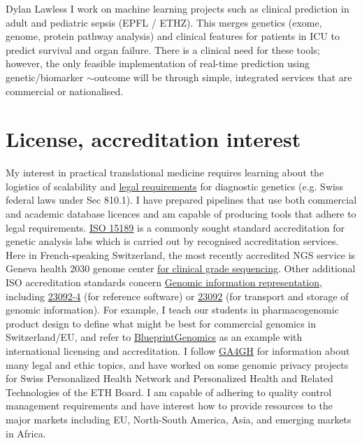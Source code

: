 \documentclass[11pt,a4paper]{article}
\begin{document}
\begin{cv}{Dylan Lawless}
I work on machine learning projects such as clinical prediction in adult and pediatric sepsis (EPFL / ETHZ). 
This merges genetics (exome, genome, protein pathway analysis) and clinical features for patients in ICU to predict  survival and organ failure. 
There is a clinical need for these tools; however, the only feasible implementation of real-time prediction using genetic/biomarker $\sim$outcome will be through simple, integrated services that are commercial or nationalised. 

\section*{License, accreditation interest}
My interest in practical translational medicine requires learning about the logistics of scalability and 
\href{https://lawlessgenomics.com/topic/pharmacogenomics#legal-requirements}{legal requirements} 
for diagnostic genetics (e.g. Swiss federal laws under Sec 810.1).
I have prepared pipelines that use both commercial and academic database licences and am capable of producing tools that adhere to legal requirements. 
\href{https://www.iso.org/standard/56115.html}{ISO 15189}
is a commonly sought standard accreditation for genetic analysis labs which is carried out by recognised accreditation services.
Here in French-speaking Switzerland, the most recently accredited NGS service is Geneva health 2030 genome center 
\href{https://www.health2030genome.ch/dna-sequencing-platform/}{
for clinical grade sequencing}. 
Other additional ISO accreditation standards concern 
\href{https://www.iso.org/search.html?q=Genomic\%20information\%20representation&hPP=10&idx=all_en&p=0&hFR\%5Bcategory\%5D\%5B0\%5D=standard}{Genomic information representation}, 
including 
\href{https://www.iso.org/standard/75859.html}{23092-4} (for reference software)
or 
\href{https://www.iso.org/standard/79882.html}{
23092} (for transport and storage of genomic information).
For example, I teach our students in pharmacogenomic product design to 
define what might be best for commercial genomics in Switzerland/EU, and refer to
\href{https://blueprintgenetics.com/certifications/}{BlueprintGenomics} as an example with international licensing and accreditation.
I follow \href{https://www.ga4gh.org}{GA4GH} for information about many legal and ethic topics, and have worked on some genomic privacy projects for Swiss Personalized Health Network and Personalized Health and Related Technologies of the ETH Board.
I am capable of adhering to quality control management requirements and have interest how to provide resources to the major markets including EU, North-South America, Asia, and emerging markets in Africa.


\end{cv}
\end{document}
